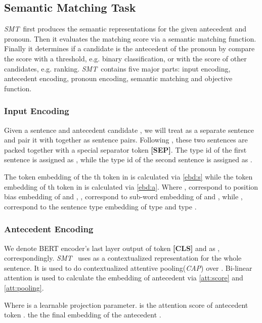 \documentclass[11pt,a4paper]{article}
\newcommand{\smt}{\textit{SMT}}
\begin{document}
\subsection{Semantic Matching Task}
\label{sec:smt}






\smt~first produces the semantic representations for the given antecedent and pronoun. Then it evaluates the matching score via a semantic matching function. Finally it determines if a candidate is the antecedent of the pronoun by compare the score with a threshold, e.g. binary classification, or with the score of other candidates, e.g. ranking.
\smt~contains five major parts: input encoding, antecedent encoding, pronoun encoding, semantic matching and objective function.

\subsubsection{Input Encoding}
\label{sec:smt-input}
Given a sentence  and antecedent candidate , we will treat  as a separate sentence and pair it with  together as sentence pairs. Following \cite{devlin2018bert}, these two sentences are packed together with a special separator token \textbf{[SEP]}.  The type id of the first sentence  is assigned as , while the type id of the second sentence  is assigned as .




The token embedding of the th token  in  is calculated via  \eqref{ebd:s} while the token embedding of th token  in  is calculated via \eqref{ebd:a}. Where ,  correspond to position bias embedding of  and , , correspond to sub-word embedding of   and , while ,  correspond to the sentence type embedding of type  and type .

\subsubsection{Antecedent Encoding}
We denote BERT\cite{devlin2018bert} encoder's last layer output of token \textbf{[CLS]} and  as , correspondingly.
\smt~ uses  as a contextualized representation for the whole sentence. It is used to do contextualized attentive pooling(\textit{CAP}) over . Bi-linear attention is used to calculate the embedding of antecedent via \eqref{att:score} and \eqref{att:pooling}. 





Where  is a learnable projection parameter.  is the attention score of antecedent token .  the the final embedding of the antecedent .
\end{document}
